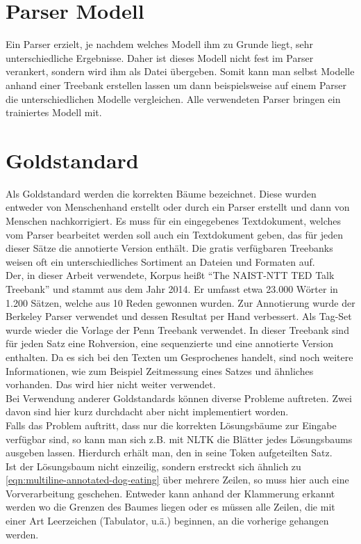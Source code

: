 \section{Parser Modell}
Ein Parser erzielt, je nachdem welches Modell ihm zu Grunde liegt, sehr unterschiedliche Ergebnisse. Daher ist dieses Modell nicht fest im Parser verankert, sondern wird ihm als Datei übergeben. Somit kann man selbst Modelle anhand einer Treebank erstellen lassen um dann beispielsweise auf einem Parser die unterschiedlichen Modelle vergleichen. Alle verwendeten Parser bringen ein trainiertes Modell mit.  %

\section{Goldstandard}
Als Goldstandard werden die korrekten Bäume bezeichnet. Diese wurden entweder von Menschenhand erstellt oder durch ein Parser erstellt und dann von Menschen nachkorrigiert. Es muss für ein eingegebenes Textdokument, welches vom Parser bearbeitet werden soll auch ein Textdokument geben, das für jeden dieser Sätze die annotierte Version enthält. Die gratis verfügbaren Treebanks weisen oft ein unterschiedliches Sortiment an Dateien und Formaten auf.\\
Der, in dieser Arbeit verwendete, Korpus heißt ``The NAIST-NTT TED Talk Treebank'' und stammt aus dem Jahr 2014. Er umfasst etwa 23.000 Wörter in 1.200 Sätzen, welche aus 10 Reden gewonnen wurden. Zur Annotierung wurde der Berkeley Parser verwendet und dessen Resultat per Hand verbessert. Als Tag-Set wurde wieder die Vorlage der Penn Treebank verwendet. 
In dieser Treebank sind für jeden Satz eine Rohversion, eine sequenzierte und eine annotierte Version enthalten. Da es sich bei den Texten um Gesprochenes handelt, sind noch weitere Informationen, wie zum Beispiel Zeitmessung eines Satzes und ähnliches vorhanden. Das wird hier nicht weiter verwendet.\\
Bei Verwendung anderer Goldstandards können diverse Probleme auftreten. Zwei davon sind hier kurz durchdacht aber nicht implementiert worden.\\
Falls das Problem auftritt, dass nur die korrekten Lösungsbäume zur Eingabe verfügbar sind, so kann man sich z.B. mit NLTK %
die Blätter jedes Lösungsbaums ausgeben lassen. Hierdurch erhält man, den in seine Token aufgeteilten Satz.\\
Ist der Lösungsbaum nicht einzeilig, sondern erstreckt sich ähnlich zu \ref{eqn:multiline-annotated-dog-eating}  über mehrere Zeilen, so muss hier auch eine Vorverarbeitung geschehen. Entweder kann anhand der Klammerung erkannt werden wo die Grenzen des Baumes liegen oder es müssen alle Zeilen, die mit einer Art Leerzeichen (Tabulator, u.ä.) beginnen, an die vorherige gehangen werden.

